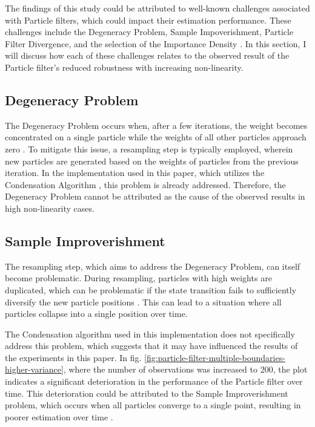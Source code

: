 \documentclass[conference]{IEEEtran}
\begin{document}
The findings of this study could be attributed to well-known challenges associated with Particle filters, which could impact their estimation performance.
These challenges include the Degeneracy Problem, Sample Impoverishment, Particle Filter Divergence, and the selection of the Importance Density \cite{b4}.
In this section, I will discuss how each of these challenges relates to the observed result of the Particle filter's reduced robustness with increasing non-linearity.


\subsection{Degeneracy Problem}
The Degeneracy Problem occurs when, after a few iterations, the weight becomes concentrated on a single particle while the weights of all other particles approach zero \cite{b4}.
To mitigate this issue, a resampling step is typically employed, wherein new particles are generated based on the weights of particles from the previous iteration.
In the implementation used in this paper, which utilizes the Condensation Algorithm \cite{b3}, this problem is already addressed.
Therefore, the Degeneracy Problem cannot be attributed as the cause of the observed results in high non-linearity cases.


\subsection{Sample Improverishment}
The resampling step, which aims to address the Degeneracy Problem, can itself become problematic.
During resampling, particles with high weights are duplicated, which can be problematic if the state transition fails to sufficiently diversify the new particle positions \cite{b4}.
This can lead to a situation where all particles collapse into a single position over time.

The Condensation algorithm used in this implementation does not specifically address this problem, which suggests that it may have influenced the results of the experiments in this paper.
In fig. \ref{fig:particle-filter-multiple-boundaries-higher-variance}, where the number of observations was increased to 200, the plot indicates a significant deterioration in the performance of the Particle filter over time.
This deterioration could be attributed to the Sample Improverishment problem, which occurs when all particles converge to a single point, resulting in poorer estimation over time \cite{b4}.
\end{document}
